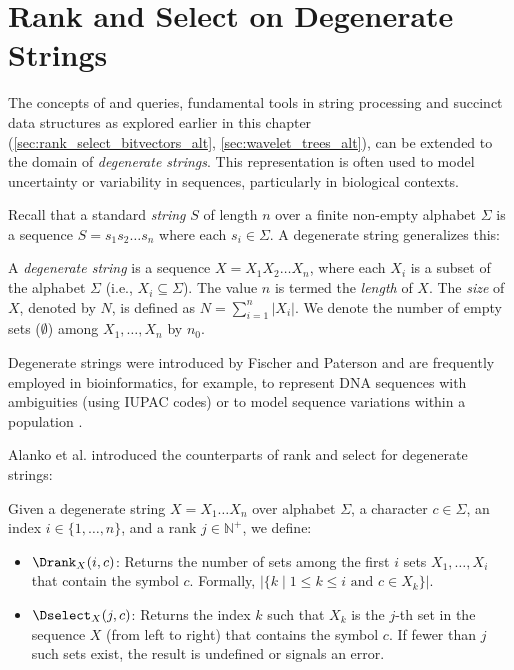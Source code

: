 \section{Rank and Select on Degenerate Strings}
\label{sec:degenerate_strings_combined_alt} %

The concepts of \Rank{} and \Select{} queries, fundamental tools in string processing and succinct data structures as explored earlier in this chapter (\autoref{sec:rank_select_bitvectors_alt}, \autoref{sec:wavelet_trees_alt}), can be extended to the domain of \emph{degenerate strings}. This representation is often used to model uncertainty or variability in sequences, particularly in biological contexts.

Recall that a standard \emph{string} $S$ of length $n$ over a finite non-empty alphabet $\Sigma$ is a sequence $S = s_1 s_2 \dots s_n$ where each $s_i \in \Sigma$. A degenerate string generalizes this:

\begin{definition} \label{def:degenerate_string_combined_alt}
    A \emph{degenerate string} is a sequence $X = X_1 X_2 \dots X_n$, where each $X_i$ is a subset of the alphabet $\Sigma$ (i.e., $X_i \subseteq \Sigma$). The value $n$ is termed the \emph{length} of $X$. The \emph{size} of $X$, denoted by $N$, is defined as $N = \sum_{i=1}^{n} |X_i|$. We denote the number of empty sets ($\emptyset$) among $X_1, \dots, X_n$ by $n_0$.
\end{definition}

Degenerate strings were introduced by Fischer and Paterson \cite{fischer1974string} and are frequently employed in bioinformatics, for example, to represent DNA sequences with ambiguities (using IUPAC codes) or to model sequence variations within a population \cite{SubsetWT, alzamel2018degenerate}.

Alanko et al. \cite{SubsetWT} introduced the counterparts of rank and select for degenerate strings:

\begin{definition} \label{def:subset_rank_select_combined_alt}
    Given a degenerate string $X = X_1 \dots X_n$ over alphabet $\Sigma$, a character $c \in \Sigma$, an index $i \in \{1, \dots, n\}$, and a rank $j \in \mathbb{N}^+$, we define:
    \begin{itemize}
        \item $\Drank_X(i, c)$: Returns the number of sets among the first $i$ sets $X_1, \dots, X_i$ that contain the symbol $c$. Formally, $|\{k \mid 1 \le k \le i \text{ and } c \in X_k\}|$.
        \item $\Dselect_X(j, c)$: Returns the index $k$ such that $X_k$ is the $j$-th set in the sequence $X$ (from left to right) that contains the symbol $c$. If fewer than $j$ such sets exist, the result is undefined or signals an error.
    \end{itemize}
\end{definition}

